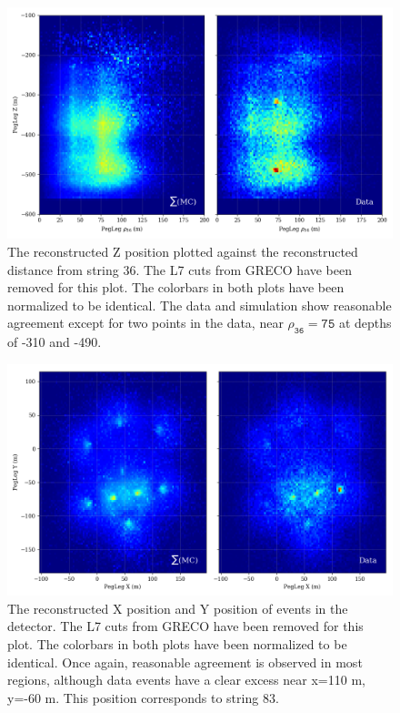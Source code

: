 \begin{center}
\label{fig:flaring_zrho}
\begin{figure}
	\includegraphics[width=0.9\linewidth]{pegleg_fine_z_rho.png}
\caption{The reconstructed Z position plotted against the reconstructed distance from string 36. The L7 cuts from GRECO have been removed for this plot. The colorbars in both plots have been normalized to be identical. The data and simulation show reasonable agreement except for two points in the data, near $\mathtt{\rho_{36}=75}$ at depths of -310 and -490. }
\end{figure}
\end{center}

\begin{center}
\label{fig:flaring_xy}
\begin{figure}
	\includegraphics[width=0.9\linewidth]{pegleg_fine_x_y.png}
\caption{The reconstructed X position and Y position of events in the detector. The L7 cuts from GRECO have been removed for this plot. The colorbars in both plots have been normalized to be identical. Once again, reasonable agreement is observed in most regions, although data events have a clear excess near x=110 m, y=-60 m. This position corresponds to string 83.}
\end{figure}
\end{center}

